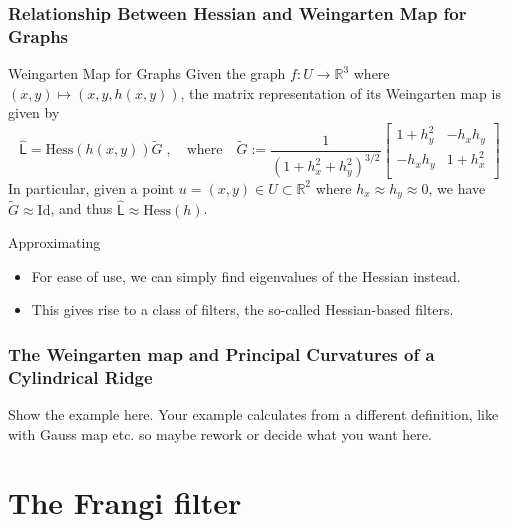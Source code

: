 \documentclass[9pt,notes]{beamer}
\begin{document}
\begin{frame}
\frametitle{Relationship Between Hessian and Weingarten Map for Graphs}
    \begin{block}{Weingarten Map for Graphs}
    Given the graph $f: U \to \mathbb{R}^3$ where $(x,y) \mapsto (x, y, h(x,y))$, the matrix
    representation of its Weingarten map is given by
    \begin{equation}
    \widehat{\mathsf{L}} = \mathrm{Hess}(h(x,y)) \tilde{G} \;,\quad \mathrm{where} \quad
    \tilde{G} := \frac{1}{\left({1+h_x^2 + h_y^2}\right)^{3/2}}
    \begin{bmatrix}
    1 + h_y^2 & -h_x h_y \\
    -h_x h_y & 1 + h_x^2 \\
    \end{bmatrix} 
    \end{equation}
    In particular, given a point $u = (x,y) \in U \subset \mathbb{R}^2$
    where $h_x \approx h_y \approx 0$, we
    have $\tilde{G} \approx \mathrm{Id}$, and thus
    $\widehat{\mathsf{L}} \approx \mathrm{Hess}(h)$.
  \end{block}
  \begin{block}{Approximating}
    \begin{itemize}
    \item For ease of use, we can simply find eigenvalues of the Hessian instead.
    \item This gives rise to a class of filters, the so-called Hessian-based filters.
    \end{itemize}
  \end{block}
\end{frame}

\begin{frame}
  \frametitle{The Weingarten map and Principal Curvatures of a Cylindrical Ridge} 
Show the example here. Your example calculates from a different definition, like with Gauss map etc. so maybe rework or decide what you want here. 
\end{frame}


\section{The Frangi filter}
\end{document}
